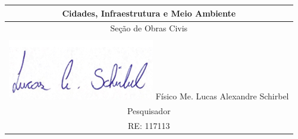 \begin{table}[h]
  \centering
  \setlength{\arrayrulewidth}{0.9pt} %
  \begin{tabular}{|c|}
    \hline
    Cidades, Infraestrutura e Meio Ambiente \\
    \hline
    Seção de Obras Civis \\
    \hline \\[0.5pt]
    \includegraphics{./figuras/assinatura.png}
    \hline
    Físico Me. Lucas Alexandre Schirbel \\
    Pesquisador \\
    RE: 117113 \\
    \hline
  \end{tabular}
\end{table}
